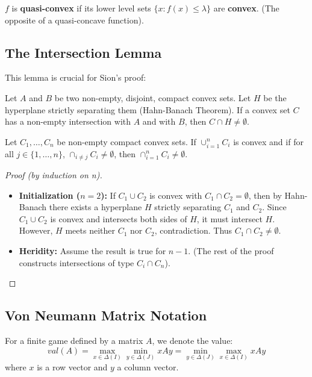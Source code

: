 \begin{definition}
$f$ is \textbf{quasi-convex} if its lower level sets $\{x : f(x) \le \lambda\}$ are \textbf{convex}. (The opposite of a quasi-concave function).
\end{definition}

\subsection{The Intersection Lemma}
This lemma is crucial for Sion's proof:
\begin{lemme}
Let $A$ and $B$ be two non-empty, disjoint, compact convex sets. Let $H$ be the hyperplane strictly separating them (Hahn-Banach Theorem). If a convex set $C$ has a non-empty intersection with $A$ and with $B$, then $C \cap H \neq \emptyset$.
\end{lemme}

\begin{lemme}[Intersection]
Let $C_1, \dots, C_n$ be non-empty compact convex sets. If $\cup_{i=1}^n C_i$ is convex and if for all $j \in \{1,\dots,n\}$, $\cap_{i \neq j} C_i \neq \emptyset$, then $\cap_{i=1}^n C_i \neq \emptyset$.
\end{lemme}

\begin{proof}[Proof (by induction on n)]
\begin{itemize}
    \item \textbf{Initialization ($n=2$):} If $C_1 \cup C_2$ is convex with $C_1 \cap C_2 = \emptyset$, then by Hahn-Banach there exists a hyperplane $H$ strictly separating $C_1$ and $C_2$. Since $C_1 \cup C_2$ is convex and intersects both sides of $H$, it must intersect $H$. However, $H$ meets neither $C_1$ nor $C_2$, contradiction. Thus $C_1 \cap C_2 \neq \emptyset$.
    \item \textbf{Heridity:} Assume the result is true for $n-1$. (The rest of the proof constructs intersections of type $C_i \cap C_n$).
\end{itemize}
\end{proof}

\subsection{Von Neumann Matrix Notation}
For a finite game defined by a matrix $A$, we denote the value:
\[ val(A) = \max_{x \in \Delta(I)} \min_{y \in \Delta(J)} xAy = \min_{y \in \Delta(J)} \max_{x \in \Delta(I)} xAy \]
where $x$ is a row vector and $y$ a column vector.

